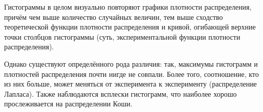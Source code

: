 Гистограммы в целом визуально повторяют графики плотности распределения, причём чем выше количество случайных величин, тем выше сходство теоретической функции плотности распределения и кривой, огибающей верхние точки столбцов гистограммы (суть, экспериментальной функции плотности распределения).

Однако существуют определённого рода различия: так, максимумы гистограмм и плотностей распределения почти нигде не совпали. Более того, соотношение, кто из них больше, может меняться от эксперимента к эксперименту (распределение Лапласа). Также наблюдаются всплески гистограмм, что наиболее хорошо прослеживается на распределении Коши.
